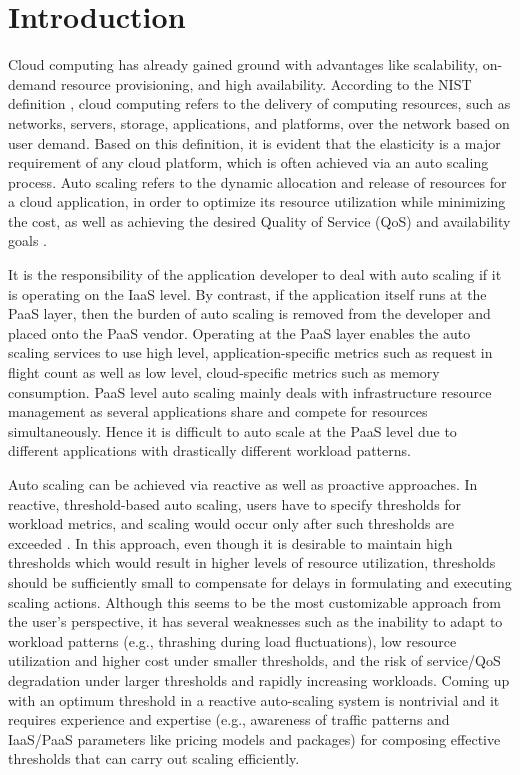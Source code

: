 \section{Introduction}
Cloud computing has already gained ground with advantages like scalability, on-demand resource provisioning, and high availability. According to the NIST definition \cite{Mell_2011}, cloud computing refers to the delivery of computing resources, such as networks, servers, storage, applications, and platforms, over the network based on user demand. Based on this definition, it is evident that the elasticity is a major requirement of any cloud platform, which is often achieved via an auto scaling process. Auto scaling refers to the dynamic allocation and release of resources for a cloud application, in order to optimize its resource utilization while minimizing the cost, as well as achieving the desired Quality of Service (QoS) and availability goals \cite{Roy_2011} \cite{Armbrust_2010}.

It is the responsibility of the application developer to deal with auto scaling if it is operating on the IaaS level. By contrast, if the application itself runs at the PaaS layer, then the burden of auto scaling is removed from the developer and placed onto the PaaS vendor. Operating at the PaaS layer enables the auto scaling services to use high level, application-specific metrics such as request in flight count as well as low level, cloud-specific metrics such as memory consumption. PaaS level auto scaling mainly deals with infrastructure resource management as several applications share and compete for resources simultaneously. Hence it is difficult to auto scale at the PaaS level due to different applications with drastically different workload patterns.  

Auto scaling can be achieved via reactive as well as proactive approaches. In reactive, threshold-based auto scaling, users have to specify thresholds for workload metrics, and scaling would occur only after such thresholds are exceeded \cite{Lorido_Botran_2014}. In this approach, even though it is desirable to maintain high thresholds which would result in higher levels of resource utilization, thresholds should be sufficiently small to compensate for delays in formulating and executing scaling actions. Although this seems to be the most customizable approach from the user’s perspective, it has several weaknesses \cite{Alipour_2014} such as the inability to adapt to workload patterns (e.g., thrashing during load fluctuations), low resource utilization and higher cost under smaller thresholds, and the risk of service/QoS degradation under larger thresholds and rapidly increasing workloads. Coming up with an optimum threshold in a reactive auto-scaling system is nontrivial and it requires experience and expertise (e.g., awareness of traffic patterns and IaaS/PaaS parameters like pricing models and packages) for composing effective thresholds that can carry out scaling efficiently.

